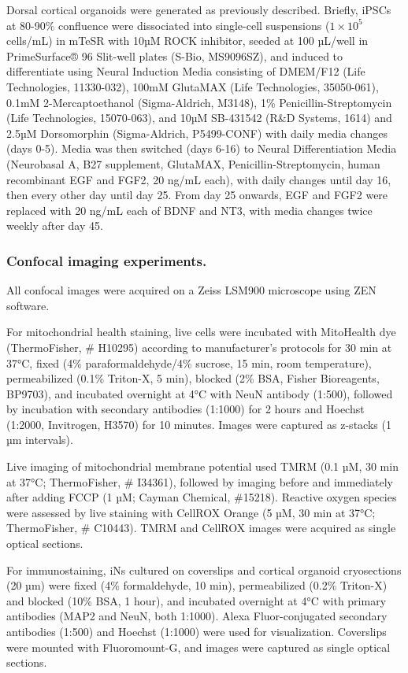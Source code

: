 Dorsal cortical organoids were generated as previously described\supercite{Sloan2018-ja}. Briefly, iPSCs at 80-90\% confluence were dissociated into single-cell suspensions ($1\times10^5$ cells/mL) in mTeSR with 10µM ROCK inhibitor, seeded at 100 µL/well in PrimeSurface® 96 Slit-well plates (S-Bio, MS9096SZ), and induced to differentiate using Neural Induction Media consisting of DMEM/F12 (Life Technologies, 11330-032), 100mM GlutaMAX (Life Technologies, 35050-061), 0.1mM 2-Mercaptoethanol (Sigma-Aldrich, M3148), 1\% Penicillin-Streptomycin (Life Technologies, 15070-063), and 10µM SB-431542 (R&D Systems, 1614) and 2.5µM Dorsomorphin (Sigma-Aldrich, P5499-CONF) with daily media changes (days 0-5). Media was then switched (days 6-16) to Neural Differentiation Media (Neurobasal A, B27 supplement, GlutaMAX, Penicillin-Streptomycin, human recombinant EGF and FGF2, 20 ng/mL each), with daily changes until day 16, then every other day until day 25. From day 25 onwards, EGF and FGF2 were replaced with 20 ng/mL each of BDNF and NT3, with media changes twice weekly after day 45.

\subsubsection{Confocal imaging experiments.}
All confocal images were acquired on a Zeiss LSM900 microscope using ZEN software.

For mitochondrial health staining, live cells were incubated with MitoHealth dye (ThermoFisher, \# H10295) according to manufacturer's protocols for 30 min at 37°C, fixed (4\% paraformaldehyde/4\% sucrose, 15 min, room temperature), permeabilized (0.1\% Triton-X, 5 min), blocked (2\% BSA, Fisher Bioreagents, BP9703), and incubated overnight at 4°C with NeuN antibody (1:500), followed by incubation with secondary antibodies (1:1000) for 2 hours and Hoechst (1:2000, Invitrogen, H3570) for 10 minutes. Images were captured as z-stacks (1 µm intervals).

Live imaging of mitochondrial membrane potential used TMRM (0.1 µM, 30 min at 37°C; ThermoFisher, \# I34361), followed by imaging before and immediately after adding FCCP (1 µM; Cayman Chemical, \#15218). Reactive oxygen species were assessed by live staining with CellROX Orange (5 µM, 30 min at 37°C; ThermoFisher, \# C10443). TMRM and CellROX images were acquired as single optical sections.

For immunostaining, iNs cultured on coverslips and cortical organoid cryosections (20 µm) were fixed (4\% formaldehyde, 10 min), permeabilized (0.2\% Triton-X) and blocked (10\% BSA, 1 hour), and incubated overnight at 4°C with primary antibodies (MAP2 and NeuN, both 1:1000). Alexa Fluor-conjugated secondary antibodies (1:500) and Hoechst (1:1000) were used for visualization. Coverslips were mounted with Fluoromount-G, and images were captured as single optical sections.

